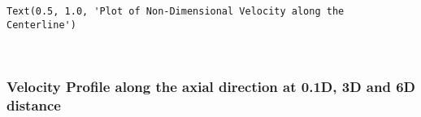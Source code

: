 \documentclass[11pt]{article}
\makeatletter
\newcommand{\boxspacing}{\kern\kvtcb@left@rule\kern\kvtcb@boxsep}
\newcommand{\prompt}[4]{
        {\ttfamily\llap{{\color{#2}[#3]:\hspace{3pt}#4}}\vspace{-\baselineskip}}
    }
\makeatother
\begin{document}
            \begin{tcolorbox}[breakable, size=fbox, boxrule=.5pt, pad at break*=1mm, opacityfill=0]
\prompt{Out}{outcolor}{73}{\boxspacing}
\begin{Verbatim}[commandchars=\\\{\}]
Text(0.5, 1.0, 'Plot of Non-Dimensional Velocity along the Centerline')
\end{Verbatim}
\end{tcolorbox}
        
    \begin{center}
    \end{center}
    { \hspace*{\fill} \\}
    
    \hypertarget{velocity-profile-along-the-axial-direction-at-0.1d-3d-and-6d-distance}{%
\subsubsection{Velocity Profile along the axial direction at 0.1D, 3D
and 6D
distance}\label{velocity-profile-along-the-axial-direction-at-0.1d-3d-and-6d-distance}}
\end{document}
